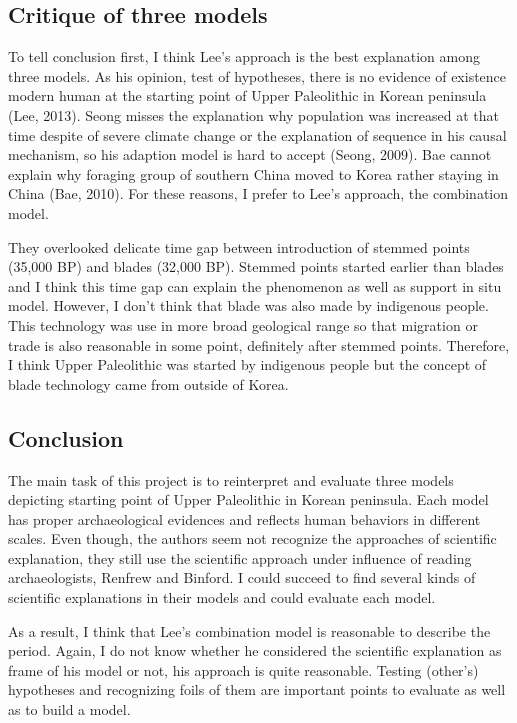 \documentclass[american,man]{apa6}
\begin{document}
\subsection{Critique of three models}\label{critique-of-three-models}

To tell conclusion first, I think Lee's approach is the best explanation
among three models. As his opinion, test of hypotheses, there is no
evidence of existence modern human at the starting point of Upper
Paleolithic in Korean peninsula (Lee, 2013). Seong misses the
explanation why population was increased at that time despite of severe
climate change or the explanation of sequence in his causal mechanism,
so his adaption model is hard to accept (Seong, 2009). Bae cannot
explain why foraging group of southern China moved to Korea rather
staying in China (Bae, 2010). For these reasons, I prefer to Lee's
approach, the combination model.

They overlooked delicate time gap between introduction of stemmed points
(35,000 BP) and blades (32,000 BP). Stemmed points started earlier than
blades and I think this time gap can explain the phenomenon as well as
support in situ model. However, I don't think that blade was also made
by indigenous people. This technology was use in more broad geological
range so that migration or trade is also reasonable in some point,
definitely after stemmed points. Therefore, I think Upper Paleolithic
was started by indigenous people but the concept of blade technology
came from outside of Korea.

\subsection{Conclusion}\label{conclusion}

The main task of this project is to reinterpret and evaluate three
models depicting starting point of Upper Paleolithic in Korean
peninsula. Each model has proper archaeological evidences and reflects
human behaviors in different scales. Even though, the authors seem not
recognize the approaches of scientific explanation, they still use the
scientific approach under influence of reading archaeologists, Renfrew
and Binford. I could succeed to find several kinds of scientific
explanations in their models and could evaluate each model.

As a result, I think that Lee's combination model is reasonable to
describe the period. Again, I do not know whether he considered the
scientific explanation as frame of his model or not, his approach is
quite reasonable. Testing (other's) hypotheses and recognizing foils of
them are important points to evaluate as well as to build a model.
\end{document}
